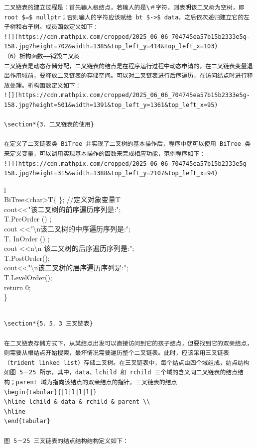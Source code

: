 \documentclass[10pt]{article}
\begin{document}
\begin{verbatim}
二叉链表的建立过程是：首先输人根结点，若输人的是\＃字符，则表明该二叉树为空树，即 root $=$ nullptr；否则输人的字符应该赋给 bt $->$ data，之后依次递归建立它的左子树和右子树。成员函数定义如下：
![](https://cdn.mathpix.com/cropped/2025_06_06_704745ea57b15b2333e5g-158.jpg?height=702&width=1385&top_left_y=414&top_left_x=103)
（6）析构函数——销毁二叉树
二叉链表是动态存储分配，二叉链表的结点是在程序运行过程中动态申请的，在二叉链表变量退出作用域前，要释放二叉链表的存储空间。可以对二叉链表进行后序遍历，在访问结点时进行释放处理。析构函数定义如下：
![](https://cdn.mathpix.com/cropped/2025_06_06_704745ea57b15b2333e5g-158.jpg?height=501&width=1391&top_left_y=1361&top_left_x=95)

\section*{3．二叉链表的使用}

在定义了二叉链表类 BiTree 并实现了二叉树的基本操作后，程序中就可以使用 BiTree 类来定义变量，可以调用实现基本操作的函数来完成相应功能，范例程序如下：
![](https://cdn.mathpix.com/cropped/2025_06_06_704745ea57b15b2333e5g-158.jpg?height=315&width=1388&top_left_y=2107&top_left_x=94)
\end{verbatim}

l\\
BiTree<char>T\{ \}; //定义对象变量T\\
cout<<"该二叉树的前序遍历序列是:";\\
T.PreOrder () ;\\
cout <<"\textbackslash n该二叉树的中序遍历序列是:";\\
T. InOrder () ;\\
cout <<n\textbackslash n 该二又树的后序遍历序列是:";\\
T.PostOrder();\\
cout<<"\textbackslash n该二叉树的层序遍历序列是:";\\
T.LevelOrder();\\
return 0;\\
\}

\begin{verbatim}

\section*{5．5．3 三叉链表}

在二叉链表存储方式下，从某结点出发可以直接访问到它的孩子结点，但要找到它的双亲结点，则需要从根结点开始搜索，最坏情况需要遍历整个二叉链表。此时，应该采用三叉链表（trident linked list）存储二叉树。在三叉链表中，每个结点由四个域组成，结点结构如图 5－25 所示，其中，data、lchild 和 rchild 三个域的含义同二叉链表的结点结构；parent 域为指向该结点的双亲结点的指针。三叉链表的结点
\begin{tabular}{|l|l|l|l|}
\hline lchild & data & rchild & parent \\
\hline
\end{tabular}

图 5－25 三叉链表的结点结构结构定义如下：
\end{verbatim}
\end{document}
